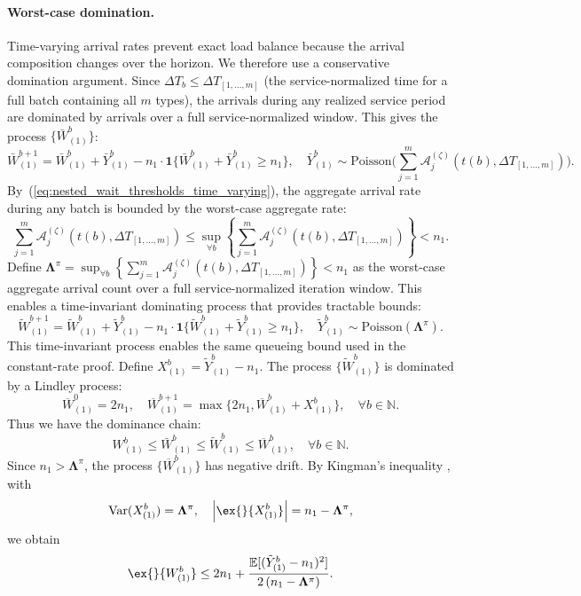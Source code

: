 \paragraph{Worst-case domination.} Time-varying arrival rates prevent exact load balance because the arrival composition changes over the horizon. We therefore use a conservative domination argument. Since $\Delta T_b\leq \Delta T_{[1,\dots,m]}$ (the service-normalized time for a full batch containing all $m$ types), the arrivals during any realized service period are dominated by arrivals over a full service-normalized window. This gives the process $\{\bar{W}_{(1)}^{b}\}$:
$$ \bar{W}_{(1)}^{b+1} = \bar{W}_{(1)}^{b} + \bar{Y}_{(1)}^b  - n_1 \cdot \mathbf{1}\{ \bar{W}_{(1)}^{b} + \bar{Y}_{(1)}^b \geq n_1 \},  \quad \bar{Y}_{(1)}^b \sim \text{Poisson}\Big(  \sum_{j=1}^m \mathcal A_j^{(\zeta)}(t(b),\Delta T_{[1,\dots,m]}) \Big).  $$
By~(\ref{eq:nested_wait_thresholds_time_varying}), the aggregate arrival rate during any batch is bounded by the worst-case aggregate rate:
$$ \sum_{j=1}^m \mathcal A_j^{(\zeta)}(t(b),\Delta T_{[1,\dots,m]}) \leq \sup_{\forall b}\left\{\sum_{j=1}^m \mathcal A_j^{(\zeta)}(t(b),\Delta T_{[1,\dots,m]}) \right\} < n_1.$$
Define $\mathbf{\Lambda}^{\pi} = \sup_{\forall b}\left\{\sum_{j=1}^m \mathcal A_j^{(\zeta)}(t(b),\Delta T_{[1,\dots,m]}) \right\} < n_1$ as the worst-case aggregate arrival count over a full service-normalized iteration window. This enables a time-invariant dominating process that provides tractable bounds:
$$ \tilde{W}_{(1)}^{b+1} = \tilde{W}_{(1)}^{b} + \tilde{Y}_{(1)}^b  - n_1 \cdot \mathbf{1}\{ \tilde{W}_{(1)}^{b} + \tilde{Y}_{(1)}^b \geq n_1 \},  \quad \tilde{Y}_{(1)}^b \sim \text{Poisson}(\mathbf{\Lambda}^{\pi}).  $$
This time-invariant process enables the same queueing bound used in the constant-rate proof. Define $X_{(1)}^b = \tilde{Y}_{(1)}^b - n_1$. The process $\{ \tilde{W}_{(1)}^{b}\}$ is dominated by a Lindley process:
$$ \overline{W}_{(1)}^{0} = 2n_1,\quad  \overline{W}_{(1)}^{b+1} = \max \{  2n_1, \overline{W}_{(1)}^{b} + X_{(1)}^b \},\quad \forall b \in \mathbb{N}. $$
Thus we have the dominance chain:
$$ W_{(1)}^{b}\leq \bar{W}_{(1)}^{b} \leq \tilde{W}_{(1)}^{b} \leq \overline{W}_{(1)}^{b}, \quad \forall b \in \mathbb{N}.$$
Since $n_1> \mathbf{\Lambda}^{\pi}$, the process $\{\overline{W}_{(1)}^{b} \}$ has negative drift. By Kingman's inequality \citep{kingman1962queues}, with
$$\text{Var}(X_{(1)}^b ) = \mathbf{\Lambda}^{\pi},\quad \left|  \ex{}{X_{(1)}^b} \right| = n_1 - \mathbf{\Lambda}^{\pi},$$
we obtain
$$  \ex{}{W_{(1)}^b}\leq  2n_1 + \frac{\mathbb{E}[(\tilde{Y}_{(1)}^b-n_1)^2]}{2\left(n_1 -\mathbf{\Lambda}^{\pi}\right)}. $$
